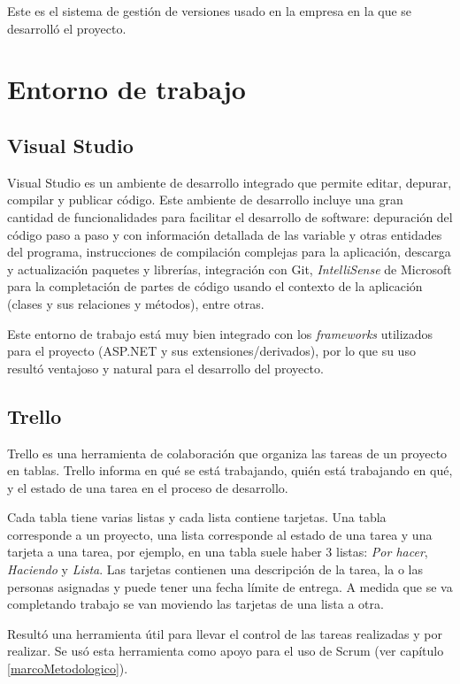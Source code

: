 Este es el sistema de gestión de versiones usado en la empresa en la que se desarrolló el proyecto.

\section{Entorno de trabajo}
\subsection{Visual Studio}
Visual Studio es un ambiente de desarrollo integrado que permite editar, depurar, compilar y publicar código. \cite{visualStudioMicrosoft} Este ambiente de desarrollo incluye una gran cantidad de funcionalidades para facilitar el desarrollo de software: depuración del código paso a paso y con información detallada de las variable y otras entidades del programa, instrucciones de compilación complejas para la aplicación, descarga y actualización paquetes y librerías, integración con Git, \textit{IntelliSense} de Microsoft para la completación de partes de código usando el contexto de la aplicación (clases y sus relaciones y métodos), entre otras.

Este entorno de trabajo está muy bien integrado con los \textit{frameworks} utilizados para el proyecto (ASP.NET y sus extensiones/derivados), por lo que su uso resultó ventajoso y natural para el desarrollo del proyecto.

\subsection{Trello}
Trello es una herramienta de colaboración que organiza las tareas de un proyecto en tablas. Trello informa en qué se está trabajando, quién está trabajando en qué, y el estado de una tarea en el proceso de desarrollo.

Cada tabla tiene varias listas y cada lista contiene tarjetas. Una tabla corresponde a un proyecto, una lista corresponde al estado de una tarea y una tarjeta a una tarea, por ejemplo, en una tabla suele haber 3 listas: \emph{Por hacer}, \emph{Haciendo} y \emph{Lista}. Las tarjetas contienen una descripción de la tarea, la o las personas asignadas y puede tener una fecha límite de entrega. A medida que se va completando trabajo se van moviendo las tarjetas de una lista a otra.

Resultó una herramienta útil para llevar el control de las tareas realizadas y por realizar. Se usó esta herramienta como apoyo para el uso de Scrum (ver capítulo \ref{marcoMetodologico}).
